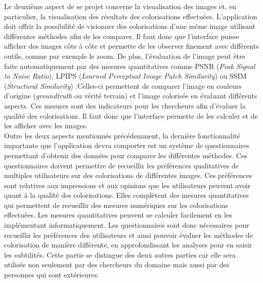 \documentclass{article}
\begin{document}
Le deuxième aspect de se projet concerne la visualisation des images et, en particulier, la visualisation des résultats des colorisations effectuées. 
L'application doit offrir la possibilité de visionner des colorisations d'une même image utilisant différentes méthodes afin de les comparer.
Il faut donc que l'interface puisse afficher des images côte à côte et permette de les observer finement avec différents outils, comme par exemple le zoom.
De plus, l’évaluation de l’image peut être faite automatiquement par des mesures quantitatives comme PSNR (\textit{Peak Signal to Noise Ratio}), LPIPS (\textit{Learned Perceptual Image Patch Similarity}) ou SSIM (\textit{Structural Similarity}) .Celles-ci permettent de comparer l’image en couleurs d'origine (\textit{groundtruth} ou vérité terrain) et l'image colorisée
en évaluant différents aspects. Ces mesures sont des indicateurs pour les chercheurs afin d'évaluer la qualité des colorisations.
Il faut donc que l'interface permette de les calculer et de les afficher avec les images.
\\

Outre les deux aspects mentionnés précédemment, la dernière fonctionnalité importante que l'application devra comporter est
un système de questionnaires permettant d’obtenir des données pour comparer les différentes méthodes. Ces questionnaires 
doivent permettre de recueillir les préférences qualitatives de multiples utilisateurs sur des colorisations de différentes images.
Ces préférences sont relatives aux impressions et aux opinions que les utilisateurs peuvent avoir quant à la qualité
des colorisations. Elles complètent des mesures quantitatives qui permettent de recueillir des mesures numériques sur les colorisations effectuées.
Les mesures quantitatives peuvent se calculer facilement en les implémentant informatiquement. Les questionnaires sont donc nécessaires
pour recueillir les préférences des utilisateurs et ainsi pouvoir évaluer les méthodes de colorisation de manière différente, 
en approfondissant les analyses pour en saisir les subtilités. Cette partie se distingue des deux autres parties car elle sera utilisée non seulement 
par des chercheurs du domaine mais aussi par des personnes qui sont extérieures.
\\
\end{document}
